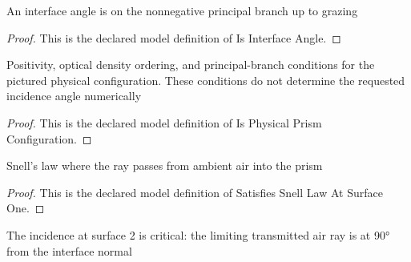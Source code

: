\begin{definition}
  \label{def:physics:phyx-mini-0016:phyxminiproblems-problemphyxmini0016-isinterfaceangle}
  An interface angle is on the nonnegative principal branch up to grazing
\end{definition}
\begin{proof}
  This is the declared model definition of Is Interface Angle.
\end{proof}
\begin{definition}
  \label{def:physics:phyx-mini-0016:phyxminiproblems-problemphyxmini0016-isphysicalprismconfiguration}
  Positivity, optical density ordering, and principal-branch conditions for the pictured physical configuration. These conditions do not determine the requested incidence angle numerically
\end{definition}
\begin{proof}
  This is the declared model definition of Is Physical Prism Configuration.
\end{proof}
\begin{definition}
  \label{def:physics:phyx-mini-0016:phyxminiproblems-problemphyxmini0016-satisfiessnelllawatsurfaceone}
  Snell's law where the ray passes from ambient air into the prism
\end{definition}
\begin{proof}
  This is the declared model definition of Satisfies Snell Law At Surface One.
\end{proof}
\begin{definition}
  \label{def:physics:phyx-mini-0016:phyxminiproblems-problemphyxmini0016-satisfiescriticalanglelawatsurfacetwo}
  The incidence at surface 2 is critical: the limiting transmitted air ray is at 90° from the interface normal
\end{definition}
